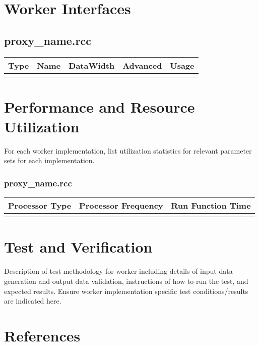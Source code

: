 \documentclass{article}
\def\comp{proxy\_name}
\begin{document}
\begin{landscape}
\begin{scriptsize}
\begin{tabular}{|M{2cm}|M{1.5cm}|M{4cm}|c|c|M{9cm}|}
			&
			&
			&
			& \\
			\hline
		\end{tabular}
	\end{scriptsize}

	\section*{Worker Interfaces}
	\subsection*{\comp.rcc}
	\begin{scriptsize}
		\begin{tabular}{|M{2cm}|M{1.5cm}|c|c|M{12cm}|}
			\hline
			Type & Name & DataWidth & Advanced & Usage \\
			\hline

			&
			&
			& \\
			\hline
		\end{tabular}
	\end{scriptsize}
\end{landscape}

\section*{Performance and Resource Utilization}
For each worker implementation, list utilization statistics for relevant parameter sets for each implementation.
\subsubsection*{\comp.rcc}
\begin{scriptsize}
	\begin{tabular}{|c|c|c|}
		\hline
		\rowcolor{blue}
		Processor Type & Processor Frequency & Run Function Time \\
		\hline
		               &                     &                   \\
		\hline
	\end{tabular}
\end{scriptsize}

\section*{Test and Verification}
\begin{flushleft}
	Description of test methodology for worker including details of input data generation and output data validation, instructions of how to run the test, and expected results. Ensure worker implementation specific test conditions/results are indicated here.
\end{flushleft}

\section*{References}
\begin{flushleft}
\end{flushleft}
\end{document}
